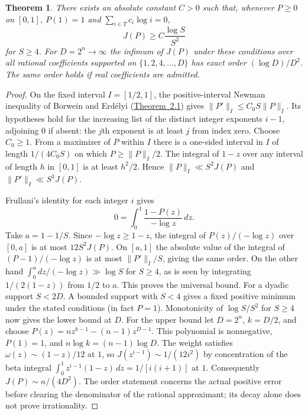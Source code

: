 \documentclass[11pt,a4paper,oneside,openany]{report}
\newtheorem{theorem}{Theorem}[section]
\theoremstyle{remark}\newtheorem{remark}[theorem]{Remark}
\numberwithin{equation}{section}
\begin{document}
\begin{theorem}\label{ch4:st:dyadic-opt}
There exists an absolute constant $C>0$ such that, whenever
$P\ge0$ on $[0,1]$, $P(1)=1$ and $\sum_{i\in T}c_i\log i=0$,
\[
                        J(P)\ge C\frac{\log S}{S^2}
\]
for $S\ge4$. For $D=2^n\to\infty$ the infimum of $J(P)$ under these
conditions over all rational coefficients supported on
$\{1,2,4,\ldots,D\}$ has exact order $(\log D)/D^2$.
The same order holds if real coefficients are admitted.
\end{theorem}
\begin{proof}
On the fixed interval $I=[1/2,1]$, the positive-interval
Newman inequality of Borwein and Erd\'elyi
(\href{https://people.tamu.edu/~terdelyi/papers-online/positive.pdf}
{Theorem~2.1}) gives
$\|P'\|_I\le C_0 S\|P\|_I$. Its hypotheses hold for the increasing
list of the distinct integer exponents $i-1$, adjoining $0$ if absent:
the $j$th exponent is at least $j$ from index zero.
Choose $C_0\ge1$. From a maximizer of $P$ within $I$ there is a
one-sided interval in $I$ of length $1/(4C_0 S)$ on which
$P\ge\|P\|_I/2$. The integral of $1-z$ over any interval of length
$h$ in $[0,1]$ is at least $h^2/2$. Hence $\|P\|_I\ll S^2J(P)$
and $\|P'\|_I\ll S^3J(P)$.

Frullani's identity for each integer $i$ gives
\[
                0=\int_0^1\frac{1-P(z)}{-\log z}\,dz .
\]
Take $a=1-1/S$. Since $-\log z\ge1-z$, the integral of
$P(z)/(-\log z)$ over $[0,a]$ is at most
$12 S^2J(P)$. On $[a,1]$ the absolute value of the integral of
$(P-1)/(-\log z)$ is at most $\|P'\|_I/S$, giving the same order.
On the other hand $\int_0^a dz/(-\log z)\gg\log S$ for $S\ge4$,
as is seen by integrating $1/(2(1-z))$ from $1/2$ to $a$.
This proves the universal bound. For a dyadic support $S<2D$.
A bounded support with $S<4$ gives a fixed positive minimum under the
stated conditions (in fact $P=1$). Monotonicity of $\log S/S^2$ for
$S\ge4$ now gives the lower bound at $D$. For the upper bound let $D=2^n$, $k=D/2$, and choose
$P(z)=n z^{k-1}-(n-1)z^{D-1}$. This polynomial is nonnegative,
$P(1)=1$, and $n\log k=(n-1)\log D$. The weight satisfies
$\omega(z)\sim(1-z)/12$ at $1$, so
$J(z^{i-1})\sim1/(12 i^2)$ by concentration of the beta integral
$\int_0^1z^{i-1}(1-z)\,dz=1/[i(i+1)]$ at $1$.
Consequently $J(P)\sim n/(4D^2)$.
The order statement concerns the actual positive error before clearing
the denominator of the rational approximant; its decay alone does not
prove irrationality.
\end{proof}
\end{document}

